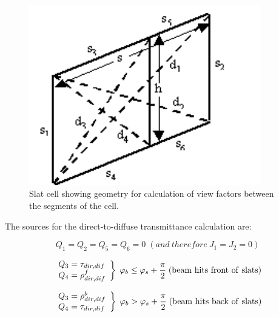 \begin{figure}[hbtp] %
\centering
\includegraphics[width=0.9\textwidth, height=0.9\textheight, keepaspectratio=true]{media/image1063.png}
\caption{Slat cell showing geometry for calculation of view factors between the segments of the cell. \protect \label{fig:slat-cell-showing-geometry-for-calculation-of}}
\end{figure}

The sources for the direct-to-diffuse transmittance calculation are:

\begin{equation}
{Q_1} = {Q_2} = {Q_5} = {Q_6} = 0 \;  (and~therefore~{J_1} = {J_2} = 0)
\end{equation}

\begin{equation}
\left.
    \begin{array}{l}
      Q_3 = \tau_{dir,dif} \\
      Q_4 = \rho_{dir,dif}^f
    \end{array}
  \right\}
  \;
  \varphi_b \le \varphi_s + \frac{\pi }{2}
  \;
  \rm{ (beam~hits~front~of~slats)}
\end{equation}

\begin{equation}
\left.
    \begin{array}{l}
      Q_3 = \rho_{dir,dif}^b \\
      Q_4 = \tau_{dir,dif}
    \end{array}
  \right\}
  \;
  \varphi_b > \varphi_s + \frac{\pi }{2}
  \;
  \rm{ (beam~hits~back~of~slats)}
\end{equation}

